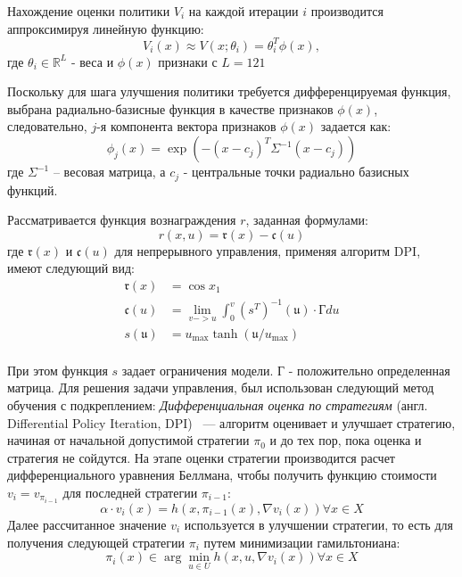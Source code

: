 Нахождение оценки политики $V_i$ на каждой итерации $i$ производится аппроксимируя линейную функцию:
%
\begin{equation*}
V_i(x) \approx V(x; \theta_i) = \theta^T_i \phi(x),
\end{equation*}
где $\theta_i \in \mathbb{R}^L$ - веса и $\phi(x)$ признаки с $L=121$ 

Поскольку для шага улучшения политики требуется дифференцируемая функция, выбрана радиально-базисные функция в качестве признаков $\phi(x)$, следовательно, $j$-я компонента вектора признаков $\phi(x)$ задается как:
%
\begin{equation*}
	\phi_j(x) = \exp(-(x - c_j)^T \Sigma^{-1}(x-c_j))
\end{equation*}
%
где $\Sigma^{-1}$ -- весовая матрица, а $c_j$ - центральные точки радиально базисных функций.

Рассматривается функция вознаграждения $r$, заданная формулами:
\begin{equation*}
r(x,u) = \mathfrak r(x) - \mathfrak c(u)
\end{equation*}
где $\mathfrak r(x)$ и $\mathfrak c(u)$ для непрерывного управления, применяя алгоритм DPI, имеют следующий вид:
	\begin{equation*}
	\begin{split}
	\mathfrak r(x) &= \cos x_1\\
	\mathfrak c(u) &= \lim_{v->u} \int_0^v {(s^T)^{-1}}(\mathfrak u) \cdot \text{Г} du\\
	s(\mathfrak u) &= u_{\max} \tanh(\mathfrak u/u_{\max})\\
	\end{split}
	\end{equation*}

При этом функция $s$ задает ограничения модели. Г - положительно определенная матрица.
%
Для решения задачи управления, был использован следующий метод обучения с подкреплением: \textit{Дифференциальная оценка по стратегиям} (англ. Differential Policy Iteration, DPI) ~---
алгоритм оценивает и улучшает стратегию, начиная от начальной допустимой стратегии \( \pi_0 \) и до тех пор, пока оценка и стратегия не сойдутся. На этапе оценки стратегии производится расчет дифференциального уравнения Беллмана, чтобы получить функцию стоимости \(v_i = v_{\pi_{i-1}}\) для последней стратегии \( \pi_{i - 1} \):
\begin{equation}
\alpha \cdot v_i(x) = h(x, \pi_{i-1}(x), \nabla v_i(x))   \forall x \in X
\end{equation}
Далее рассчитанное значение \(v_i\) используется в улучшении стратегии, то есть для получения следующей стратегии \( \pi_i \)  путем минимизации гамильтониана:
\begin{equation}
\pi_i(x) \in \arg \underset{u \in U}{\min}  h(x,u, \nabla v_i(x))   \forall x \in X
\end{equation}

